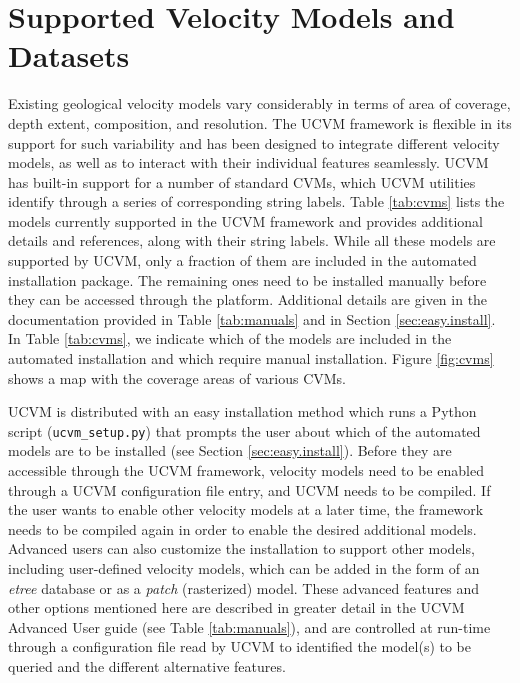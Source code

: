 




\section{Supported Velocity Models and Datasets}
\label{sec:cvms}

Existing geological velocity models vary considerably in terms of area of coverage, depth extent, composition, and resolution. The UCVM framework is flexible in its support for such variability and has been designed to integrate different velocity models, as well as to interact with their individual features seamlessly. UCVM has built-in support for a number of standard CVMs, which UCVM utilities identify through a series of corresponding string labels. Table \ref{tab:cvms} lists the models currently supported in the UCVM framework and provides additional details and references, along with their string labels. While all these models are supported by UCVM, only a fraction of them are included in the automated installation package. The remaining ones need to be installed manually before they can be accessed through the platform. Additional details are given in the documentation provided in Table \ref{tab:manuals} and in Section \ref{sec:easy.install}. In Table \ref{tab:cvms}, we indicate which of the models are included in the automated installation and which require manual installation. Figure \ref{fig:cvms} shows a map with the coverage areas of various CVMs.

UCVM is distributed with an easy installation method which runs a Python script (\texttt{ucvm\_setup.py}) that prompts the user about which of the automated models are to be installed (see Section \ref{sec:easy.install}). Before they are accessible through the UCVM framework, velocity models need to be enabled through a UCVM configuration file entry, and UCVM needs to be compiled. If the user wants to enable other velocity models at a later time, the framework needs to be compiled again in order to enable the desired additional models. Advanced users can also customize the installation to support other models, including user-defined velocity models, which can be added in the form of an \textit{etree} \citep{Tu_2003_Tech} database or as a \textit{patch} (rasterized) model. These advanced features and other options mentioned here are described in greater detail in the UCVM Advanced User guide (see Table \ref{tab:manuals}), and are controlled at run-time through a configuration file read by UCVM to identified the model(s) to be queried and the different alternative features.

